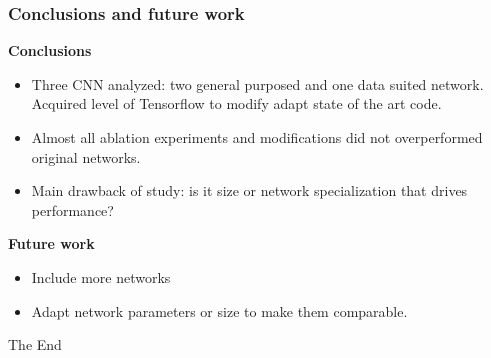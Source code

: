 \documentclass{beamer}
\begin{document}
\begin{frame}
\frametitle{Conclusions and future work}

\textbf{Conclusions}
\begin{itemize}
\item Three CNN analyzed: two general purposed and one data suited network. Acquired level of Tensorflow to modify adapt state of the art code.
\item Almost all ablation experiments and modifications did not overperformed original networks.
\item Main drawback of study: is it size or network specialization that drives performance?
\end{itemize}
\textbf{Future work}
\begin{itemize}
\item Include more networks
\item Adapt network parameters or size to make them comparable.
\end{itemize}
\end{frame}




\begin{frame}
\Huge{\centerline{The End}}
\end{frame}



\end{document}
